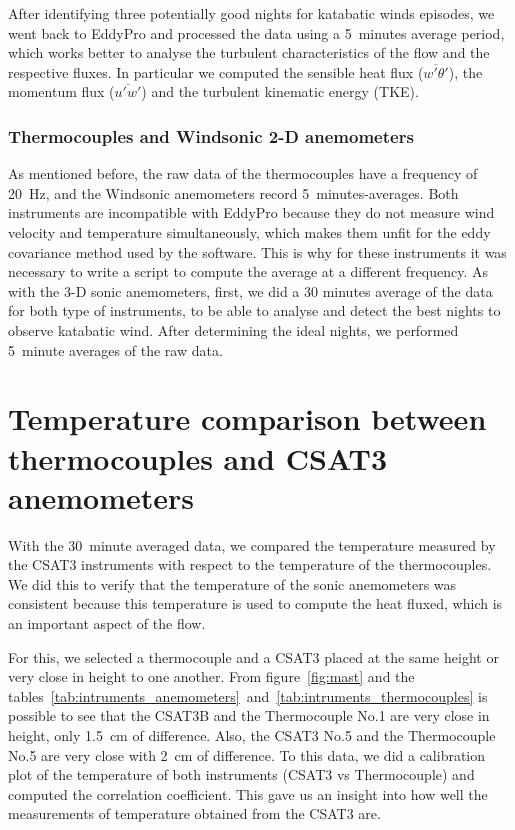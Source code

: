 After identifying three potentially good nights for katabatic winds episodes, we went back to EddyPro and processed the data using a 5~minutes average period, which works better to analyse the turbulent characteristics of the flow and the respective fluxes. In particular we computed the sensible heat flux ($\overline{w'\theta'}$), the momentum flux ($\overline{u'w'}$) and the turbulent kinematic energy (TKE).

\subsubsection{Thermocouples and Windsonic 2-D anemometers}

As mentioned before, the raw data of the thermocouples have a frequency of 20~Hz, and the Windsonic anemometers record 5~minutes-averages. Both instruments are incompatible with EddyPro because they do not measure wind velocity and temperature simultaneously, which makes them unfit for the eddy covariance method used by the software. This is why for these instruments it was necessary to write a script to compute the average at a different frequency. As with the 3-D sonic anemometers, first, we did a 30 minutes average of the data for both type of instruments, to be able to analyse and detect the best nights to observe katabatic wind. After determining the ideal nights, we performed 5~minute averages of the raw data.

\section{Temperature comparison between thermocouples and CSAT3 anemometers}

With the 30~minute averaged data, we compared the temperature measured by the CSAT3 instruments with respect to the temperature of the thermocouples. We did this to verify that the temperature of the sonic anemometers was consistent because this temperature is used to compute the heat fluxed, which is an important aspect of the flow. 

For this, we selected a thermocouple and a CSAT3 placed at the same height or very close in height to one another. From figure~\ref{fig:mast} and the tables~\ref{tab:intruments_anemometers}~and~\ref{tab:intruments_thermocouples} is possible to see that the CSAT3B and the Thermocouple No.1 are very close in height, only 1.5~cm of difference. Also, the CSAT3 No.5 and the Thermocouple No.5 are very close with 2~cm of difference. To this data, we did a calibration plot of the temperature of both instruments (CSAT3 vs Thermocouple) and computed the correlation coefficient. This gave us an insight into how well the measurements of temperature obtained from the CSAT3 are. 

